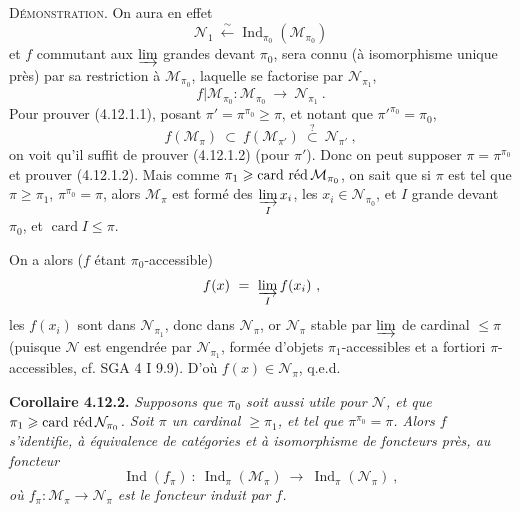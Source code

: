 \documentclass[11pt]{article}
\newcommand{\printedpage}[1]{\marginpar{\footnotesize p.~#1}}
\newcommand{\msp}[1]{\marginpar{\footnotesize [#1]}}
\newcommand{\cardred}{\operatorname{card}\,\text{\upshape réd}\,}
\newcommand{\Ind}{\operatorname{Ind}}
\begin{document}
\textsc{Démonstration}. On aura en effet
\[
\mathcal{N}_1 \ \xleftarrow{\ \sim\ } \Ind_{\pi_0}(\mathcal{M}_{\pi_0})
\]
et $f$ commutant aux $\varinjlim$ grandes devant $\pi_0$, sera connu (à isomorphisme unique près) par sa restriction à $\mathcal{M}_{\pi_0}$, laquelle se factorise par $\mathcal{N}_{\pi_1}$,
\[
f|\mathcal{M}_{\pi_0} : \mathcal{M}_{\pi_0} \ \longrightarrow \ \mathcal{N}_{\pi_1} \ .
\]
Pour prouver (4.12.1.1), posant $\pi' = \pi^{\pi_0} \geqslant \pi$, et notant que $\pi'^{\pi_0} = \pi_0$,
\[
f(\mathcal{M}_\pi) \ \subset \ f(\mathcal{M}_{\pi'}) \ \overset{?}{\subset} \ \mathcal{N}_{\pi'} \ ,
\]
\printedpage{103}
on voit qu'il suffit de prouver (4.12.1.2) (pour $\pi'$). Donc on peut supposer $\pi = \pi^{\pi_0}$ et prouver (4.12.1.2). Mais comme $\pi_1 \geqslant \cardred \mathcal{M}_{\pi_0}$, on sait que si $\pi$ est tel que $\pi \geqslant \pi_1$, $\pi^{\pi_0} = \pi$, alors $\mathcal{M}_\pi$ est formé des $\varinjlim\limits_{I} x_i$, les $x_i \in \mathcal{N}_{\pi_0}$, et $I$ grande devant $\pi_0$, et $\operatorname{card} I \leqslant \pi$.

\msp{page 275}

On a alors ($f$ étant $\pi_0$-accessible)
\[
f(x) \ = \ \varinjlim_{I} f(x_i) \ ,
\]
les $f(x_i)$ sont dans $\mathcal{N}_{\pi_1}$, donc dans $\mathcal{N}_\pi$, or $\mathcal{N}_\pi$ stable par $\varinjlim$ de cardinal $\leqslant \pi$ (puisque $\mathcal{N}$ est engendrée par $\mathcal{N}_{\pi_1}$, formée d'objets $\pi_1$-accessibles et a fortiori $\pi$-accessibles, cf. SGA 4 I 9.9). D'où $f(x) \in \mathcal{N}_\pi$, q.e.d.

\textbf{Corollaire 4.12.2.} \textit{Supposons que $\pi_0$ soit aussi utile pour $\mathcal{N}$, et que $\pi_1 \geqslant \cardred \mathcal{N}_{\pi_0}$. Soit $\pi$ un cardinal $\geqslant \pi_1$, et tel que $\pi^{\pi_0} = \pi$. Alors $f$ s'identifie, à équivalence de catégories et à isomorphisme de foncteurs près, au foncteur}
\[
\Ind(f_\pi) \ : \ \Ind_\pi(\mathcal{M}_\pi) \ \longrightarrow \ \Ind_\pi(\mathcal{N}_\pi) \ ,
\]
\textit{où $f_\pi : \mathcal{M}_\pi \longrightarrow \mathcal{N}_\pi$ est le foncteur induit par $f$.}
\end{document}
